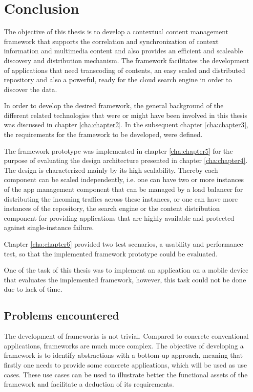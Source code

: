 \chapter{Conclusion\label{cha:chapter7}}
The objective of this thesis is to develop a contextual content management framework that supports the correlation and synchronization of context information and multimedia content and also provides an efficient and scaleable discovery and distribution mechanism. The framework facilitates the development of applications that need transcoding of contents, an easy scaled and distributed repository and also a powerful, ready for the cloud search engine in order to discover the data. 

In order to develop the desired framework, the general background of the different related technologies that were or might have been involved in this thesis was discussed in chapter \ref{cha:chapter2}. In the subsequent chapter \ref{cha:chapter3}, the requirements for the framework to be developed, were defined.

The framework prototype was implemented in chapter \ref{cha:chapter5} for the purpose of evaluating the design architecture presented in chapter \ref{cha:chapter4}. The design is characterized mainly by its high scalability. Thereby each component can be scaled independently, i.e. one can have two or more instances of the app management component that can be managed by a load balancer for distributing the incoming traffics across these instances, or one can have more instances of the repository, the search engine or the content distribution component for providing applications that are highly available and protected against single-instance failure.

Chapter \ref{cha:chapter6} provided two test scenarios, a usability and performance test, so that the implemented framework prototype could be evaluated.

One of the task of this thesis was to implement an application on a mobile device that evaluates the implemented framework, however, this task could not be done due to lack of time.
 
\section{Problems encountered}
The development of frameworks is not trivial. Compared to concrete conventional applications, frameworks are much more complex. The objective of developing a framework is to identify abstractions with a bottom-up approach, meaning that firstly one needs to provide some concrete applications, which will be used as use cases. These use cases can be used to illustrate better the functional assets of the framework and facilitate a deduction of its requirements.

